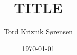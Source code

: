 \documentclass[a4paper]{article}
\begin{document}
\title{TITLE}
\author{Tord Kriznik Sørensen}
\date{\today}
\maketitle


%

\end{document}
